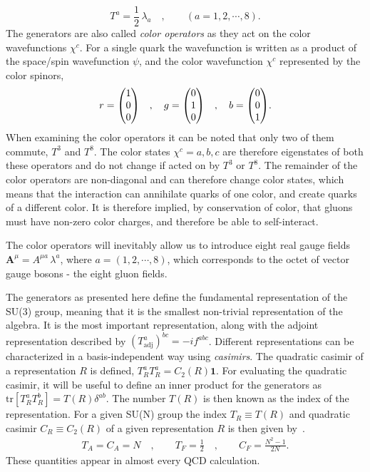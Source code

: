 \documentclass[main.tex]{subfiles}
\begin{document}
\begin{equation}\label{eqn: color_operators}
    T^a = \frac{1}{2}\, \lambda_a \quad, \qquad (a=1,2,\cdots, 8).
\end{equation}
The generators are also called \emph{color operators} as they act on the color wavefunctions \(\chi^c\). For a single quark the wavefunction is written as a product of the space/spin wavefunction \(\psi\), and the color wavefunction \(\chi^c\) represented by the color spinors, 
\begin{equation}\label{eqn: color_spinors}
    r = \mqty(1\\0\\0) \quad, \quad g = \mqty(0\\1\\0) \quad, \quad b = \mqty(0\\0\\1).
\end{equation}
When examining the color operators it can be noted that only two of them commute, \(T^3\) and \(T^8\). The color states \(\chi^c =a,b,c\) are therefore eigenstates of both these operators and do not change if acted on by \(T^3\) or \(T^8\). The remainder of the color operators are non-diagonal and can therefore change color states, which means that the interaction can annihilate quarks of one color, and create quarks of a different color. It is therefore implied, by conservation of color, that gluons must have non-zero color charges, and therefore be able to self-interact. 

The color operators will inevitably allow us to introduce eight real gauge fields \(\mathbf{A}^\mu = A^{\mu a}\, \lambda^a\), where \(a=(1,2,\cdots,8)\), which corresponds to the octet of vector gauge bosons - the eight gluon fields.

The generators as presented here define the fundamental representation of the SU(3) group, meaning that it is the smallest non-trivial representation of the algebra. It is the most important representation, along with the adjoint representation described by \((T^a_{\text{adj}})^{bc}=-if^{abc}\). Different representations can be characterized in a basis-independent way using \emph{casimirs}. The quadratic casimir of a representation \(R\) is defined, \(T_R^aT_R^a = C_2(R) \mathbf{1}\). For evaluating the quadratic casimir, it will be useful to define an inner product for the generators as \(\text{tr}\left[T_R^aT_R^b\right]=T(R)\delta^{ab}\). The number \(T(R)\) is then known as the index of the representation. For a given SU(N) group the index \(T_R\equiv T(R)\) and quadratic casimir \(C_R\equiv C_2(R)\) of a given representation \(R\) is then given by~\cite[p.484-489]{schwartz2014quantum}. 
\begin{align}\label{eqn: casimirs}
    T_A = C_A = N \quad, \qquad T_F = \frac{1}{2}  \quad, \qquad C_F = \frac{N^2-1}{2N}.
\end{align}
These quantities appear in almost every QCD calculation.
\end{document}
